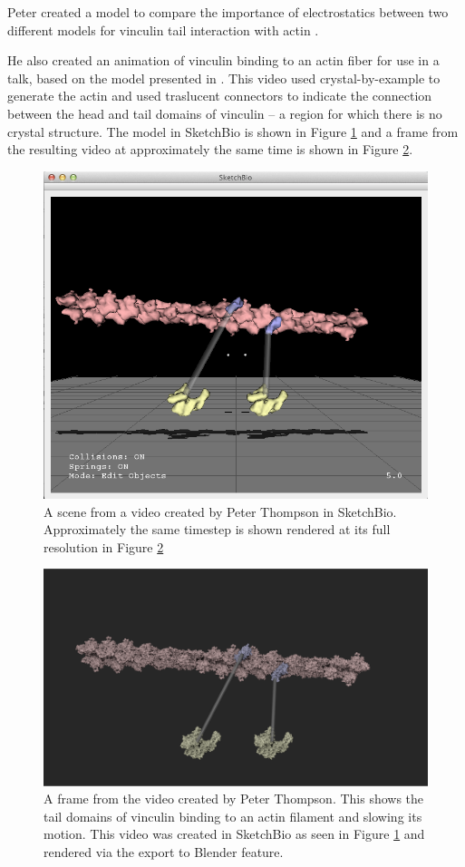 \documentclass[twocolumn]{bmcart}%
\begin{document}
Peter created a model to compare the importance of electrostatics between two different models for vinculin tail interaction with actin \cite{janssen2006three}\cite{thompson2014identification}.

He also created an animation of vinculin binding to an actin fiber for use in a talk, based on the model presented in \cite{thievessen2013vinculin}.
This video used crystal-by-example to generate the actin and used traslucent connectors to indicate the connection between the head and tail domains of vinculin -- a region for which there is no crystal structure.
The model in SketchBio is shown in Figure \ref{fig:peter_model} and a frame from the resulting video at approximately the same time is shown in Figure \ref{fig:peter_video}.

\begin{figure}[h]
\centering
\includegraphics[width=0.9\columnwidth]{peter_model.png}
\caption{A scene from a video created by Peter Thompson in SketchBio.
Approximately the same timestep is shown rendered at its full resolution in Figure \ref{fig:peter_video}}
\label{fig:peter_model}
\end{figure}

\begin{figure}[h!]
\centering
\includegraphics[width=0.9\columnwidth]{peter_video.png}
\caption{A frame from the video created by Peter Thompson.  This shows the tail domains of vinculin binding to an actin filament and slowing its motion.
This video was created in SketchBio as seen in Figure \ref{fig:peter_model} and rendered via the export to Blender feature.}
\label{fig:peter_video}
\end{figure}
\end{document}
